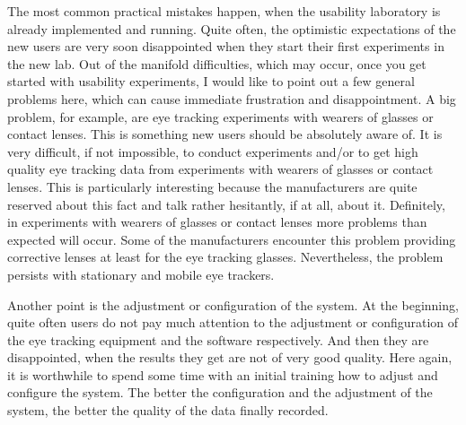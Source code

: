 \begin{
}[h]
\begin{styleBodyTextIndent}
The most common practical mistakes happen, when the usability laboratory is already implemented and running. Quite often, the optimistic expectations of the new users are very soon disappointed when they start their first experiments in the new lab. Out of the manifold difficulties, which may occur, once you get started with usability experiments, I would like to point out a few general problems here, which can cause immediate frustration and disappointment. A big problem, for example, are eye tracking experiments with wearers of glasses or contact lenses. This is something new users should be absolutely aware of. It is very difficult, if not impossible, to conduct experiments and/or to get high quality eye tracking data from experiments with wearers of glasses or contact lenses. This is particularly interesting because the manufacturers are quite reserved about this fact and talk rather hesitantly, if at all, about it. Definitely, in experiments with wearers of glasses or contact lenses more problems than expected will occur. Some of the manufacturers encounter this problem providing corrective lenses at least for the eye tracking glasses. Nevertheless, the problem persists with stationary and mobile eye trackers.
\end{styleBodyTextIndent}

\begin{styleBodyTextIndent}
Another point is the adjustment or configuration of the system. At the beginning, quite often users do not pay much attention to the adjustment or configuration of the eye tracking equipment and the software respectively. And then they are disappointed, when the results they get are not of very good quality. Here again, it is worthwhile to spend some time with an initial training how to adjust and configure the system. The better the configuration and the adjustment of the system, the better the quality of the data finally recorded.
\end{styleBodyTextIndent}


\end{
}
